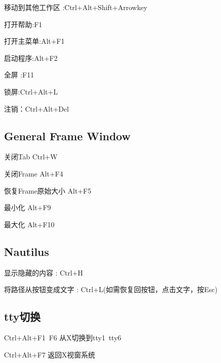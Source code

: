 移动到其他工作区 :Ctrl+Alt+Shift+Arrowkey

打开帮助:F1

打开主菜单:Alt+F1

启动程序:Alt+F2

全屏 :F11

锁屏:Ctrl+Alt+L

注销：Ctrl+Alt+Del

\subsection{General Frame Window}

关闭Tab Ctrl+W

关闭Frame Alt+F4

恢复Frame原始大小  Alt+F5

最小化 Alt+F9

最大化 Alt+F10

\subsection{Nautilus}

显示隐藏的内容 : Ctrl+H

将路径从按钮变成文字 :  Ctrl+L(如需恢复回按钮，点击文字，按Esc)



\subsection{tty切换}
Ctrl+Alt+F1~F6 从X切换到tty1~tty6

Ctrl+Alt+F7 返回X视窗系统











